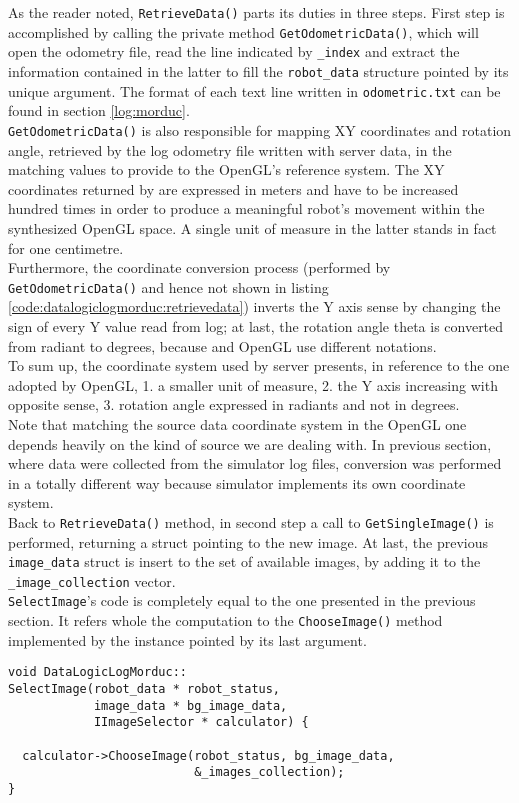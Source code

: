 As the reader noted, \texttt{RetrieveData()} parts its duties in
three steps. First step is accomplished by calling the private method
\texttt{GetOdometricData()}, which will open the odometry file, read
the line indicated by \texttt{\_index} and extract the information
contained in the latter to fill the \texttt{robot\_data} structure
pointed by its unique argument. The format of each text line written in
\texttt{odometric.txt} can be found in section \ref{log:morduc}.
\\
\texttt{GetOdometricData()} is also responsible for mapping XY
coordinates and rotation angle, retrieved by the log
odometry file written with \morduc{} server data, in the matching values
to provide to the OpenGL's reference system. The XY coordinates returned
by \morduc{} are expressed in meters and have to be increased hundred
times in order to produce a meaningful robot's movement within the
synthesized OpenGL space. A single unit of measure in the latter stands
in fact for one centimetre.
\\
Furthermore, the coordinate conversion process (performed by  
\texttt{GetOdometricData()} and hence not shown in listing 
\ref{code:datalogiclogmorduc:retrievedata}) inverts the Y axis sense
by changing the sign of every Y value read from log; at last, the
rotation angle theta is converted from radiant to degrees, because
\morduc{} and OpenGL use different notations.
\\
To sum up, the coordinate system used by \morduc{} server presents,
in reference to the one adopted by OpenGL, 1. a smaller unit of
measure, 2. the Y axis increasing with opposite sense, 3. rotation
angle expressed in radiants and not in degrees.
\\
Note that matching the source data coordinate system in the OpenGL one
depends heavily on the  kind of source we are dealing with. In previous
section, where data were collected from the simulator log files, conversion
was
performed in a totally different way because simulator implements
its own coordinate system.
\\
Back to \texttt{RetrieveData()} method, in second step a call to
\texttt{GetSingleImage()} is performed,
returning a struct pointing to the new image.
At last, the previous \texttt{image\_data} struct is insert to the set
of available images, by adding it to the \texttt{\_image\_collection}
vector.
\\
\texttt{SelectImage}'s code is completely equal to the one
presented in the previous section. It refers whole the computation to the
\texttt{ChooseImage()} method implemented by the instance pointed by
its last argument.
\\
\begin{lstlisting}[caption={\texttt{DataLogicLogMorduc::SelectImage()} method},
    label={code:datalogiclogmorduc:selectimage}]
void DataLogicLogMorduc::
SelectImage(robot_data * robot_status,
            image_data * bg_image_data,
            IImageSelector * calculator) {

  calculator->ChooseImage(robot_status, bg_image_data,
                          &_images_collection);
}

\end{lstlisting}

